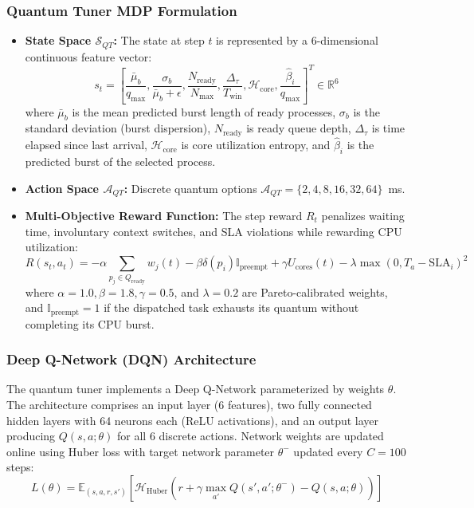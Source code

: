 \documentclass[journal]{IEEEtran}
\begin{document}
\subsubsection{Quantum Tuner MDP Formulation}
\begin{itemize}
    \item \textbf{State Space $\mathcal{S}_{QT}$:} The state at step $t$ is represented by a 6-dimensional continuous feature vector:
    \begin{equation}
    s_t = \left[ \frac{\bar{\mu}_b}{q_{\text{max}}}, \frac{\sigma_b}{\bar{\mu}_b + \epsilon}, \frac{N_{\text{ready}}}{N_{\text{max}}}, \frac{\Delta_\tau}{T_{\text{win}}}, \mathcal{H}_{\text{core}}, \frac{\hat{\beta}_i}{q_{\text{max}}} \right]^T \in \mathbb{R}^6
    \end{equation}
    where $\bar{\mu}_b$ is the mean predicted burst length of ready processes, $\sigma_b$ is the standard deviation (burst dispersion), $N_{\text{ready}}$ is ready queue depth, $\Delta_\tau$ is time elapsed since last arrival, $\mathcal{H}_{\text{core}}$ is core utilization entropy, and $\hat{\beta}_i$ is the predicted burst of the selected process.
    \item \textbf{Action Space $\mathcal{A}_{QT}$:} Discrete quantum options $\mathcal{A}_{QT} = \{2, 4, 8, 16, 32, 64\}$~ms.
    \item \textbf{Multi-Objective Reward Function:} The step reward $R_t$ penalizes waiting time, involuntary context switches, and SLA violations while rewarding CPU utilization:
    \begin{equation}
    R(s_t, a_t) = -\alpha \sum_{p_j \in Q_{\text{ready}}} w_j(t) - \beta \delta(p_i) \mathbb{I}_{\text{preempt}} + \gamma U_{\text{cores}}(t) - \lambda \max(0, T_a - \text{SLA}_i)^2
    \label{eq:reward}
    \end{equation}
    where $\alpha = 1.0, \beta = 1.8, \gamma = 0.5$, and $\lambda = 0.2$ are Pareto-calibrated weights, and $\mathbb{I}_{\text{preempt}} = 1$ if the dispatched task exhausts its quantum without completing its CPU burst.
\end{itemize}

\subsubsection{Deep Q-Network (DQN) Architecture}
The quantum tuner implements a Deep Q-Network parameterized by weights $\theta$. The architecture comprises an input layer (6 features), two fully connected hidden layers with 64 neurons each (ReLU activations), and an output layer producing $Q(s, a; \theta)$ for all 6 discrete actions. Network weights are updated online using Huber loss with target network parameter $\theta^-$ updated every $C = 100$ steps:
\begin{equation}
L(\theta) = \mathbb{E}_{(s, a, r, s')} \left[ \mathcal{H}_{\text{Huber}}\left( r + \gamma \max_{a'} Q(s', a'; \theta^-) - Q(s, a; \theta) \right) \right]
\end{equation}
\end{document}
